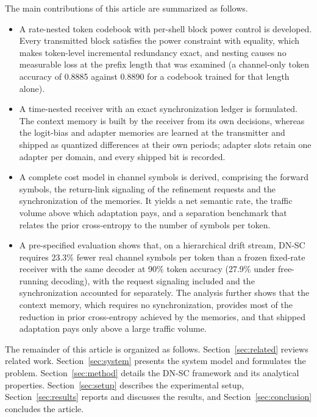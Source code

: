 The main contributions of this article are summarized as follows.
\begin{itemize}
\item A rate-nested token codebook with per-shell block power control is developed. Every transmitted block satisfies the power constraint with equality, which makes token-level incremental redundancy exact, and nesting causes no measurable loss at the prefix length that was examined (a channel-only token accuracy of 0.8885 against 0.8890 for a codebook trained for that length alone).
\item A time-nested receiver with an exact synchronization ledger is formulated. The context memory is built by the receiver from its own decisions, whereas the logit-bias and adapter memories are learned at the transmitter and shipped as quantized differences at their own periods; adapter slots retain one adapter per domain, and every shipped bit is recorded.
\item A complete cost model in channel symbols is derived, comprising the forward symbols, the return-link signaling of the refinement requests and the synchronization of the memories. It yields a net semantic rate, the traffic volume above which adaptation pays, and a separation benchmark that relates the prior cross-entropy to the number of symbols per token.
\item A pre-specified evaluation shows that, on a hierarchical drift stream, DN-SC requires 23.3\% fewer real channel symbols per token than a frozen fixed-rate receiver with the same decoder at 90\% token accuracy (27.9\% under free-running decoding), with the request signaling included and the synchronization accounted for separately. The analysis further shows that the context memory, which requires no synchronization, provides most of the reduction in prior cross-entropy achieved by the memories, and that shipped adaptation pays only above a large traffic volume.
\end{itemize}

The remainder of this article is organized as follows. Section~\ref{sec:related} reviews related work. Section~\ref{sec:system} presents the system model and formulates the problem. Section~\ref{sec:method} details the DN-SC framework and its analytical properties. Section~\ref{sec:setup} describes the experimental setup, Section~\ref{sec:results} reports and discusses the results, and Section~\ref{sec:conclusion} concludes the article.
